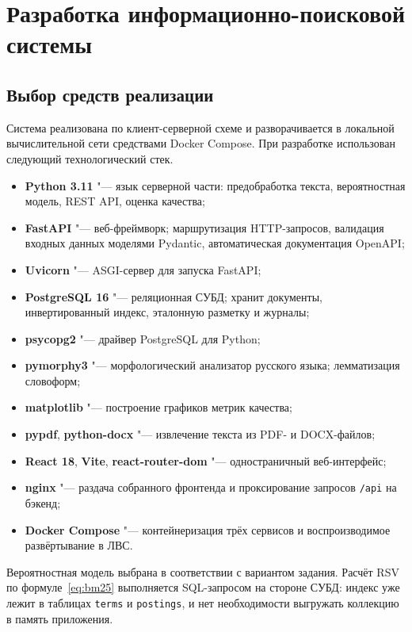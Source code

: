 \section{Разработка информационно-поисковой системы}
\label{sec:development}

\subsection{Выбор средств реализации}

Система реализована по клиент-серверной схеме и разворачивается в локальной вычислительной сети средствами Docker Compose. При разработке использован следующий технологический стек.

\begin{itemize}
	\item \textbf{Python 3.11} "--- язык серверной части: предобработка текста, вероятностная модель, REST API, оценка качества;
	\item \textbf{FastAPI} "--- веб-фреймворк; маршрутизация HTTP-запросов, валидация входных данных моделями Pydantic, автоматическая документация OpenAPI;
	\item \textbf{Uvicorn} "--- ASGI-сервер для запуска FastAPI;
	\item \textbf{PostgreSQL 16} "--- реляционная СУБД; хранит документы, инвертированный индекс, эталонную разметку и журналы;
	\item \textbf{psycopg2} "--- драйвер PostgreSQL для Python;
	\item \textbf{pymorphy3} "--- морфологический анализатор русского языка; лемматизация словоформ;
	\item \textbf{matplotlib} "--- построение графиков метрик качества;
	\item \textbf{pypdf}, \textbf{python-docx} "--- извлечение текста из PDF- и DOCX-файлов;
	\item \textbf{React 18}, \textbf{Vite}, \textbf{react-router-dom} "--- одностраничный веб-интерфейс;
	\item \textbf{nginx} "--- раздача собранного фронтенда и проксирование запросов \texttt{/api} на бэкенд;
	\item \textbf{Docker Compose} "--- контейнеризация трёх сервисов и воспроизводимое развёртывание в ЛВС.
\end{itemize}

Вероятностная модель выбрана в соответствии с вариантом задания. Расчёт RSV по формуле~\eqref{eq:bm25} выполняется SQL-запросом на стороне СУБД: индекс уже лежит в таблицах \texttt{terms} и \texttt{postings}, и нет необходимости выгружать коллекцию в память приложения.


